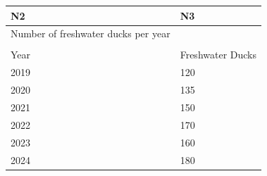 \documentclass[11pt,a4paper]{article}
\begin{document}
\begin{table}[h]
\begin{tabular}{|l|l|}
\hline
N2 & N3 \\ \hline
Number of freshwater ducks per year &  \\ \hline
 &  \\ \hline
Year & Freshwater Ducks \\ \hline
2019 & 120 \\ \hline
2020 & 135 \\ \hline
2021 & 150 \\ \hline
2022 & 170 \\ \hline
2023 & 160 \\ \hline
2024 & 180 \\ \hline
\end{tabular}
\end{table}
\end{document}
